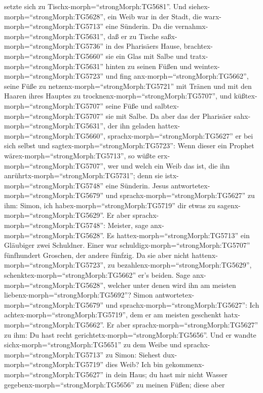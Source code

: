setzte sich zu Tischx-morph=``strongMorph:TG5681''.  Und
siehex-morph=``strongMorph:TG5628'', ein Weib war in der Stadt, die
warx-morph=``strongMorph:TG5713'' eine Sünderin. Da die
vernahmx-morph=``strongMorph:TG5631'', daß er zu Tische
saßx-morph=``strongMorph:TG5736'' in des Pharisäers Hause,
brachtex-morph=``strongMorph:TG5660'' sie ein Glas mit Salbe
 und tratx-morph=``strongMorph:TG5631'' hinten zu seinen
Füßen und weintex-morph=``strongMorph:TG5723'' und fing
anx-morph=``strongMorph:TG5662'', seine Füße zu
netzenx-morph=``strongMorph:TG5721'' mit Tränen und mit den Haaren ihres
Hauptes zu trocknenx-morph=``strongMorph:TG5707'', und
küßtex-morph=``strongMorph:TG5707'' seine Füße und
salbtex-morph=``strongMorph:TG5707'' sie mit Salbe.  Da
aber das der Pharisäer sahx-morph=``strongMorph:TG5631'', der ihn
geladen hattex-morph=``strongMorph:TG5660'',
sprachx-morph=``strongMorph:TG5627'' er bei sich selbst und
sagtex-morph=``strongMorph:TG5723'': Wenn dieser ein Prophet
wärex-morph=``strongMorph:TG5713'', so wüßte
erx-morph=``strongMorph:TG5707'', wer und welch ein Weib das ist, die
ihn anrührtx-morph=``strongMorph:TG5731''; denn sie
istx-morph=``strongMorph:TG5748'' eine Sünderin.  Jesus
antwortetex-morph=``strongMorph:TG5679'' und
sprachx-morph=``strongMorph:TG5627'' zu ihm: Simon, ich
habex-morph=``strongMorph:TG5719'' dir etwas zu
sagenx-morph=``strongMorph:TG5629''. Er aber
sprachx-morph=``strongMorph:TG5748'': Meister, sage
anx-morph=``strongMorph:TG5628''.  Es
hattex-morph=``strongMorph:TG5713'' ein Gläubiger zwei Schuldner. Einer
war schuldigx-morph=``strongMorph:TG5707'' fünfhundert Groschen, der
andere fünfzig.  Da sie aber nicht
hattenx-morph=``strongMorph:TG5723'', zu
bezahlenx-morph=``strongMorph:TG5629'',
schenktex-morph=``strongMorph:TG5662'' er's beiden. Sage
anx-morph=``strongMorph:TG5628'', welcher unter denen wird ihn am
meisten liebenx-morph=``strongMorph:TG5692''?  Simon
antwortetex-morph=``strongMorph:TG5679'' und
sprachx-morph=``strongMorph:TG5627'': Ich
achtex-morph=``strongMorph:TG5719'', dem er am meisten geschenkt
hatx-morph=``strongMorph:TG5662''. Er aber
sprachx-morph=``strongMorph:TG5627'' zu ihm: Du hast recht
gerichtetx-morph=``strongMorph:TG5656''.  Und er wandte
sichx-morph=``strongMorph:TG5651'' zu dem Weibe und
sprachx-morph=``strongMorph:TG5713'' zu Simon: Siehest
dux-morph=``strongMorph:TG5719'' dies Weib? Ich bin
gekommenx-morph=``strongMorph:TG5627'' in dein Haus; du hast mir nicht
Wasser gegebenx-morph=``strongMorph:TG5656'' zu meinen Füßen; diese aber
